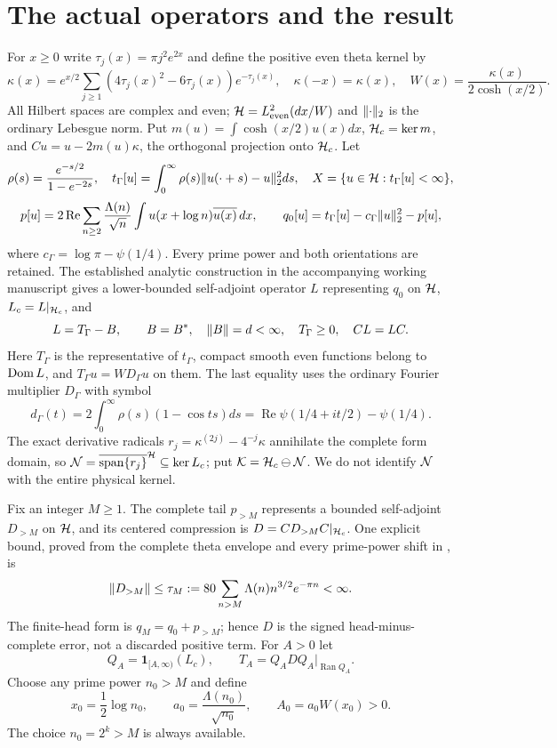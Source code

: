 \documentclass[11pt]{article}
\begin{document}
\section{The actual operators and the result}\label{setting}
For $x\ge0$ write $\tau_j(x)=\pi j^2e^{2x}$ and define the positive even theta kernel by
\[\kappa(x)=e^{x/2}\sum_{j\ge1}(4\tau_j(x)^2-6\tau_j(x))e^{-\tau_j(x)},\quad\kappa(-x)=\kappa(x),\quad W(x)=\frac{\kappa(x)}{2\cosh(x/2)}.\]
All Hilbert spaces are complex and even; $\mathcal H=L^2_{\rm even}(dx/W)$ and $\lVert\cdot\rVert_2$ is the ordinary Lebesgue norm. Put $m(u)=\int\cosh(x/2)u(x)dx$, $\mathcal H_c=\ker m$, and $Cu=u-2m(u)\kappa$, the orthogonal projection onto $\mathcal H_c$. Let
\[\rho(s)=\frac{e^{-s/2}}{1-e^{-2s}},\quad t_\Gamma[u]=\int_0^\infty\rho(s)\lVert u(\cdot+s)-u\rVert_2^2ds,\quad X=\{u\in\mathcal H:t_\Gamma[u]<\infty\},\]
\[p[u]=2\operatorname{Re}\sum_{n\ge2}\frac{\Lambda(n)}{\sqrt n}\int u(x+\log n)\overline{u(x)}\,dx,\qquad q_0[u]=t_\Gamma[u]-c_\Gamma\lVert u\rVert_2^2-p[u],\]
where $c_\Gamma=\log\pi-\psi(1/4)$. Every prime power and both orientations are retained. The established analytic construction in the accompanying working manuscript \cite{source} gives a lower-bounded self-adjoint operator $L$ representing $q_0$ on $\mathcal H$, $L_c=L|_{\mathcal H_c}$, and
\begin{equation}\label{Ldecomp}
 L=T_\Gamma-B,\qquad B=B^*,\quad \lVert B\rVert=d<\infty,\quad T_\Gamma\ge0,\quad CL=LC.
\end{equation}
Here $T_\Gamma$ is the representative of $t_\Gamma$, compact smooth even functions belong to $\operatorname{Dom} L$, and $T_\Gamma u=W D_\Gamma u$ on them. The last equality uses the ordinary Fourier multiplier $D_\Gamma$ with symbol
\begin{equation}\label{symbol}
 d_\Gamma(t)=2\int_0^\infty\rho(s)(1-\cos ts)ds
 =\operatorname{Re}\psi(1/4+it/2)-\psi(1/4).
\end{equation}
The exact derivative radicals $r_j=\kappa^{(2j)}-4^{-j}\kappa$ annihilate the complete form domain, so $\mathcal N=\overline{\operatorname{span}\{r_j\}}^{\mathcal H}\subseteq\ker L_c$; put $\mathcal K=\mathcal H_c\ominus\mathcal N$. We do not identify $\mathcal N$ with the entire physical kernel.

Fix an integer $M\ge1$. The complete tail $p_{>M}$ represents a bounded self-adjoint $D_{>M}$ on $\mathcal H$, and its centered compression is $D=CD_{>M}C|_{\mathcal H_c}$. One explicit bound, proved from the complete theta envelope and every prime-power shift in \cite{indexnote}, is
\begin{equation}\label{tailbound}
 \lVert D_{>M}\rVert\le\tau_M:=80\sum_{n>M}\Lambda(n)n^{3/2}e^{-\pi n}<\infty.
\end{equation}
The finite-head form is $q_M=q_0+p_{>M}$; hence $D$ is the signed head-minus-complete error, not a discarded positive term. For $A>0$ let
\[Q_A=\mathbf 1_{[A,\infty)}(L_c),\qquad T_A=Q_A D Q_A\big|_{\operatorname{Ran}Q_A}.\]
Choose any prime power $n_0>M$ and define
\begin{equation}\label{a0def}
 x_0=\frac12\log n_0,\qquad a_0=\frac{\Lambda(n_0)}{\sqrt{n_0}},\qquad A_0=a_0 W(x_0)>0.
\end{equation}
The choice $n_0=2^k>M$ is always available.
\end{document}
